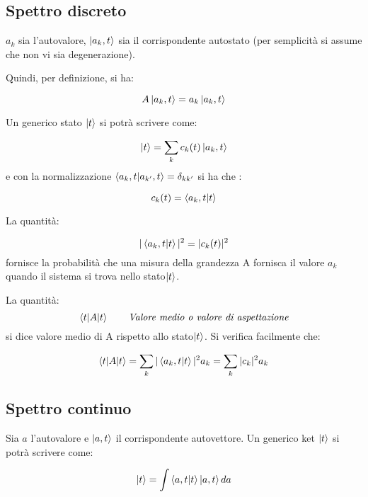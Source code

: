 \subsection{Spettro discreto}
$a_{k}$ sia l'autovalore, $\ket{a_{k},t}$ sia il corrispondente autostato (per 
semplicità si assume che non vi sia degenerazione).

Quindi, per definizione, si ha:

\begin{equation}
A\ket{a_{k},t}=a_{k}\ket{a_{k},t}
\end{equation}

Un generico stato $\ket{t}$ si potrà scrivere come:

\begin{equation}
\ket{t}=\sum_{k}c_{k}(t)\ket{a_{k},t}
\end{equation}
e con la normalizzazione $\braket{a_{k},t|a_{k'},t}=\delta_{kk'}$ si ha che :

\begin{equation}
c_{k}(t)=\braket{a_{k},t|t}
\end{equation}

La quantità:

\begin{equation}
|\braket{a_{k},t|t}|^2=|c_{k}(t)|^2
\end{equation}
fornisce la probabilità che una misura della grandezza A fornisca il valore 
$a_{k}$ quando il sistema si trova nello stato$ \ket{t}$.

La quantità:
\begin{equation}
\braket{t|A|t}     \qquad \textit{Valore medio o valore di aspettazione}
\end{equation}
si dice valore medio di A rispetto allo stato$\ket{t}$. Si verifica facilmente 
che:

\begin{equation}
\braket{t|A|t}=\sum_{k}|\braket{a_{k},t|t}|^2a_{k}= \sum_{k}|c_{k}|^2a_{k}
\end{equation}

\subsection{Spettro continuo}
Sia $a$ l'autovalore e $\ket{a,t}$ il corrispondente autovettore. Un generico 
ket $\ket{t}$ si potrà scrivere come:

\begin{equation}
\ket{t}=\int\braket{a,t|t}\ket{a,t}da
\end{equation}


